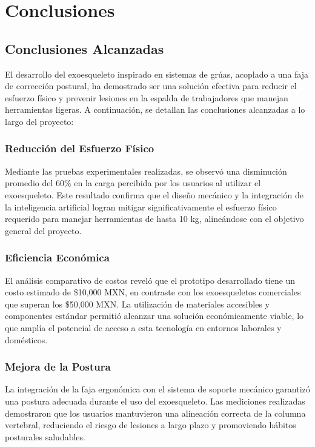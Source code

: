 \chapter{Conclusiones}
\section{Conclusiones Alcanzadas}

El desarrollo del exoesqueleto inspirado en sistemas de grúas, acoplado a una faja de corrección postural, ha demostrado ser una solución efectiva para reducir el esfuerzo físico y prevenir lesiones en la espalda de trabajadores que manejan herramientas ligeras. A continuación, se detallan las conclusiones alcanzadas a lo largo del proyecto:

\subsection{Reducción del Esfuerzo Físico}
Mediante las pruebas experimentales realizadas, se observó una disminución promedio del 60\% en la carga percibida por los usuarios al utilizar el exoesqueleto. Este resultado confirma que el diseño mecánico y la integración de la inteligencia artificial logran mitigar significativamente el esfuerzo físico requerido para manejar herramientas de hasta 10 kg, alineándose con el objetivo general del proyecto.

\subsection{Eficiencia Económica}
El análisis comparativo de costos reveló que el prototipo desarrollado tiene un costo estimado de \$10,000 MXN, en contraste con los exoesqueletos comerciales que superan los \$50,000 MXN. La utilización de materiales accesibles y componentes estándar permitió alcanzar una solución económicamente viable, lo que amplía el potencial de acceso a esta tecnología en entornos laborales y domésticos.

\subsection{Mejora de la Postura}
La integración de la faja ergonómica con el sistema de soporte mecánico garantizó una postura adecuada durante el uso del exoesqueleto. Las mediciones realizadas demostraron que los usuarios mantuvieron una alineación correcta de la columna vertebral, reduciendo el riesgo de lesiones a largo plazo y promoviendo hábitos posturales saludables.

